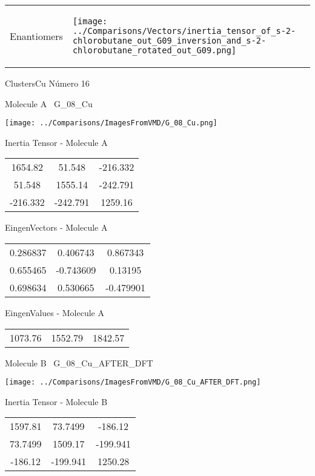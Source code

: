 \vtab[-5mm]
\begin{tabular}{*{2}{m{}}}
\begin{center}
\textcolor{NavyBlue}{\Large Enantiomers}
\end{center}
&
\begin{center}
\texttt{[image: ../Comparisons/Vectors/inertia\_tensor\_of\_s-2-chlorobutane\_out\_G09\_inversion\_and\_s-2-chlorobutane\_rotated\_out\_G09.png]}
\end{center}
\end{tabular}

 \newpage

\vtab[-3cm]
\begin{center}
{\large ClustersCu \tab Número 16}
\end{center}
\begin{multicols}{2}
\begin{center}

Molecule A \
G\_08\_Cu

\texttt{[image: ../Comparisons/ImagesFromVMD/G\_08\_Cu.png]}

Inertia Tensor - Molecule A \\
\begin{tabular}{|c c c|}
1654.82	 & 	51.548	 & 	-216.332	 \\
51.548	 & 	1555.14	 & 	-242.791	 \\
-216.332	 & 	-242.791	 & 	1259.16
\end{tabular}

\vtab
 EingenVectors - Molecule A     \\
\begin{tabular}{|c c c|}
0.286837	 & 	0.406743	 & 	0.867343	 \\
0.655465	 & 	-0.743609	 & 	0.13195	 \\
0.698634	 & 	0.530665	 & 	-0.479901
\end{tabular}

\vtab
 EingenValues - Molecule A     \\
\begin{tabular}{|c c c|}
1073.76	 & 	1552.79	 & 	1842.57	 \\
\end{tabular}
\columnbreak

Molecule B \
G\_08\_Cu\_AFTER\_DFT

\texttt{[image: ../Comparisons/ImagesFromVMD/G\_08\_Cu\_AFTER\_DFT.png]}

Inertia Tensor - Molecule B \\
\begin{tabular}{|c c c|}
1597.81	 & 	73.7499	 & 	-186.12	 \\
73.7499	 & 	1509.17	 & 	-199.941	 \\
-186.12	 & 	-199.941	 & 	1250.28
\end{tabular}


\end{center}
\end{multicols}
